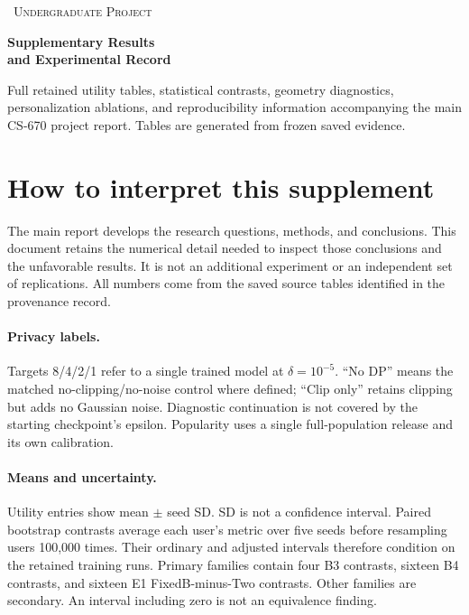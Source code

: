 \documentclass[10pt,a4paper]{article}
\begin{document}
\hypersetup{pageanchor=false}
\begin{titlepage}\centering
\vspace*{20mm}
{\Large\textsc{\CourseCode\ Undergraduate Project}\par}
\vspace{18mm}
{\huge\bfseries\color{ReportBlue}Supplementary Results\\[4mm]and Experimental Record\par}
\vspace{15mm}
{\Large\ReportTitle\par}
\vspace{15mm}
\ifx\ReportAuthor\empty\else{\large\ReportAuthor\par}\fi
\vfill
{\SubmissionDate\par}
\vspace{12mm}
\begin{minipage}{.86\linewidth}\small\centering
Full retained utility tables, statistical contrasts, geometry diagnostics,
personalization ablations, and reproducibility information accompanying
the main CS-670 project report. Tables are generated from frozen saved evidence.
\end{minipage}
\end{titlepage}
\hypersetup{pageanchor=true}
\tableofcontents
\clearpage
\section{How to interpret this supplement}
The main report develops the research questions, methods, and conclusions.
This document retains the numerical detail needed to inspect those conclusions
and the unfavorable results. It is not an additional experiment or an
independent set of replications. All numbers come from the saved source
tables identified in the provenance record.

\paragraph{Privacy labels.} Targets 8/4/2/1 refer to a single trained model
at $\delta=10^{-5}$. ``No DP'' means the matched no-clipping/no-noise control
where defined; ``Clip only'' retains clipping but adds no Gaussian noise.
Diagnostic continuation is not covered by the starting checkpoint's epsilon.
Popularity uses a single full-population release and its own calibration.

\paragraph{Means and uncertainty.} Utility entries show mean $\pm$ seed SD.
SD is not a confidence interval. Paired bootstrap contrasts average each
user's metric over five seeds before resampling users 100,000 times. Their
ordinary and adjusted intervals therefore condition on the retained training
runs. Primary families contain four B3 contrasts, sixteen B4 contrasts,
and sixteen E1 FixedB-minus-Two contrasts. Other families are secondary.
An interval including zero is not an equivalence finding.
\end{document}
